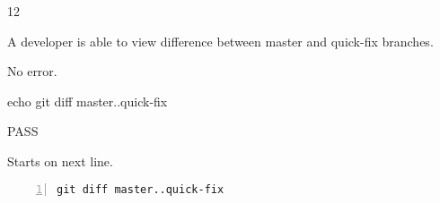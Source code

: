 \begin{description}[align=right,leftmargin=3.2cm,labelindent=3.0cm]
\item[Step:] 12
\item[Confirm:] A developer is able to view difference between master and quick-fix branches.
\item[Expectation:] No error.
\item[Command:] echo git  diff master..quick-fix
\item[Test Result:] PASS
\item[Evidence:] Starts on next line.
\end{description}
\begin{lstlisting}[numbers=left]
git diff master..quick-fix

\end{lstlisting}
